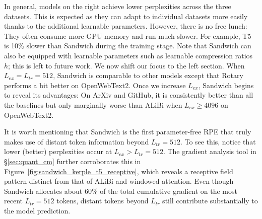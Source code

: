 \documentclass[11pt]{article}
\theoremstyle{plain}
\begin{document}
In general, models on the right achieve lower perplexities across the three datasets. This is expected as they can adapt to individual datasets more easily thanks to the additional learnable parameters. 
However, there is no free lunch: They often consume more GPU memory and run much slower. For example, T5 is 10\% slower than Sandwich during the training stage. Note that Sandwich can also be equipped with learnable parameters such as learnable compression ratios $h$; this is left to future work.
We now shift our focus to the left section. When $L_{ex}=L_{tr}=512$, Sandwich is comparable to other models except that Rotary performs a bit better on  OpenWebText2. 
Once we increase $L_{ex}$, Sandwich begins to reveal its advantages: On ArXiv and GitHub, it is consistently better than all the baselines but only marginally worse than ALiBi when $L_{ex}\geq 4096$ on OpenWebText2.

It is worth mentioning that Sandwich is the first parameter-free RPE that truly makes use of distant token information beyond $L_{tr}=512$. To see this, notice that lower (better) perplexities occur at $L_{ex}>L_{tr}=512$.
The gradient analysis tool in \S\ref{sec:quant_cm} further corroborates this in Figure~\ref{fig:sandwich_kerple_t5_receptive}, which reveals a  receptive field pattern distinct from that of ALiBi and windowed attention. Even though Sandwich allocates about 60\% of the total cumulative gradient on the most recent $L_{tr}=512$ tokens, distant tokens beyond $L_{tr}$ still contribute substantially to the model prediction.
\end{document}
